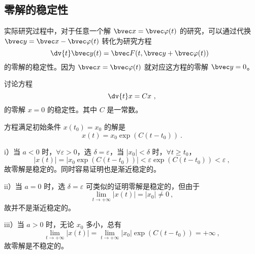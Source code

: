 \subsection{零解的稳定性}
实际研究过程中，对于任意一个解 $\bvec x = \bvec \varphi(t)$ 的研究，可以通过代换 $\bvec y = \bvec x - \bvec \varphi(t)$ 转化为研究方程 
\begin{equation}
\dv{t} \bvec y(t) = \bvec F(t, \bvec y + \bvec \varphi(t)) ~~
\end{equation}
的零解的稳定性。因为 $\bvec x = \bvec \varphi(t)$ 就对应这方程的零解 $\bvec y= 0$。

\begin{example}{}
讨论方程 
\begin{equation}
\dv{t} x = Cx ~,
\end{equation}
的零解 $x = 0$ 的稳定性。其中 $C$ 是一常数。
\end{example}

方程满足初始条件 $x(t_0) = x_0$ 的解是 
\begin{equation}
x(t) = x_0 \exp(C (t - t_0)) ~.
\end{equation}

i）当 $a<0$ 时，$\forall \varepsilon > 0$，选 $\delta = \varepsilon$，当 $|x_0| < \delta$ 时，$\forall t \ge t_0$，
\begin{equation}
|x(t)| = |x_0 \exp(C (t-t_0))| < \varepsilon \exp(C(t-t_0)) < \varepsilon ~,
\end{equation}
故零解是稳定的。同时容易证明也是渐近稳定的。

ii）当 $a=0$ 时，选 $\delta = \varepsilon$ 可类似的证明零解是稳定的，但由于 
\begin{equation}
\lim_{t \to +\infty} |x(t)| = |x_0| \neq 0 ~,
\end{equation}
故并不是渐近稳定的。

iii）当 $a > 0$ 时，无论 $x_0$ 多小，总有 
\begin{equation}
\lim_{t \to +\infty} |x(t)| = \lim_{t \to +\infty} |x_0| \exp(C(t-t_0)) = +\infty ~,
\end{equation}
故零解是不稳定的。


